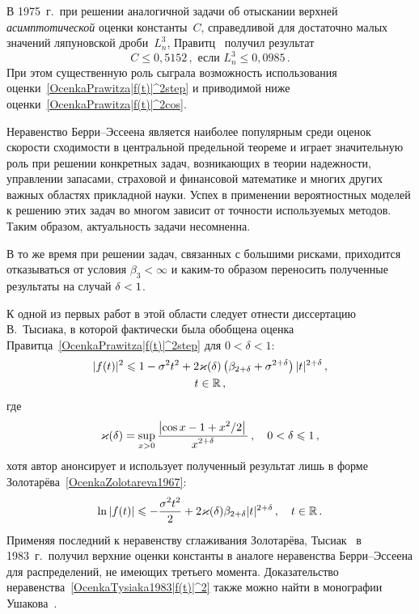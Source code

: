 \begin{multicols}{2}
В 1975~г.\ при решении аналогичной задачи об отыскании верхней
\textit{асимптотической} оценки константы~$C$, справедливой для
достаточно малых значений ляпуновской дроби~$L_n^3$,
Правитц~\cite{Prawitz1975} получил результат
\begin{equation}
\label{PrawitzAsymptBEconst}
C\le0{,}5152\,, \mbox{ если } L_n^3\le 0{,}0985\,.
\end{equation}
При этом существенную роль сыграла возможность использования
оценки~\eqref{OcenkaPrawitza|f(t)|^2step} и приводимой ниже
оценки~\eqref{OcenkaPrawitza|f(t)|^2cos}.

Неравенство Берри--Эссеена является наиболее популярным среди оценок
скорости сходимости в центральной предельной теореме и играет
значительную роль при решении конкретных задач, возникающих в теории
надежности, управлении запасами, страховой и финансовой математике и
многих других важных областях прикладной науки. Успех в применении
вероятностных моделей к решению этих задач во многом зависит от
точности используемых методов. Таким образом, актуальность задачи
несомненна.

В то же время при решении задач, связанных с большими рисками,
приходится отказываться от условия $\beta_3<\infty$ и каким-то
образом переносить полученные результаты на случай ${\delta<1}$.

К одной из первых работ в этой области следует отнести диссертацию
В.~Тысиака, в которой фактически  была обобщена оценка
Правитца~\eqref{OcenkaPrawitza|f(t)|^2step} для $0<\delta<1$:
\begin{multline}
\label{OcenkaTysiaka1983|f(t)|^2}
|f(t)|^2\leqslant1-\sigma^2t^2+
2\varkappa(\delta)\left(\beta_{2+\delta}+\sigma^{2+\delta}\right)|t|^{2+\delta}\,,\\
t\in\mathbb R\,,
\end{multline}
где
$$
\varkappa(\delta)=\sup_{x>0}\displaystyle\frac{\displaystyle \left|\cos
x-1+x^2/2\right|\mathstrut}{\displaystyle x^{2+\delta}\mathstrut}\,,\quad  0<\delta\leqslant 1\,,
$$
хотя автор анонсирует и использует полученный результат лишь в форме
Золотарёва~\eqref{OcenkaZolotareva1967}:
$$
\ln |f(t)|\leqslant-\displaystyle\frac{\displaystyle \sigma^2t^2\mathstrut}{\displaystyle 2\mathstrut}+ 2\varkappa(\delta)\beta_{2+\delta}|t|^{2+\delta}\,,\quad
t\in\mathbb R\,.
$$
Применяя последний к неравенству сглаживания Золотарёва,
Тысиак~\cite{Tysiak1983} в 1983~г.\ получил верхние оценки
константы в аналоге неравенства Берри--Эссеена для распределений, не
имеющих третьего момента.
Доказательство неравенства~\eqref{OcenkaTysiaka1983|f(t)|^2} также
можно найти в монографии Ушакова~\cite{Ushakov1999}.


\end{multicols}
